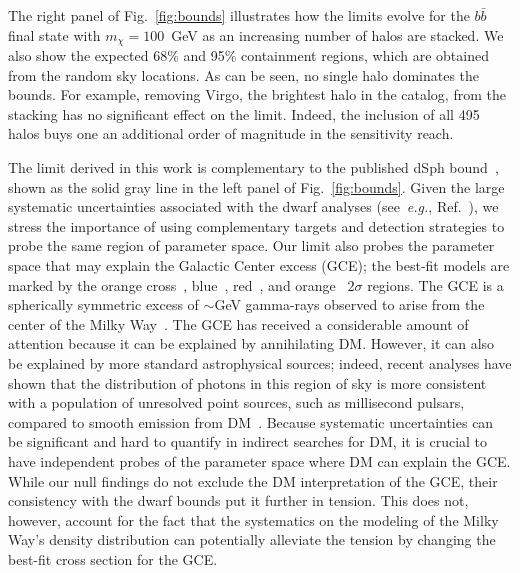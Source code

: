 The right panel of Fig.~\ref{fig:bounds} illustrates how the limits evolve for the $b \bar b$ final state with $m_\chi = 100$~GeV as an increasing number of halos are stacked.  We also show the expected 68\% and 95\% containment regions, which are obtained from the random sky locations.  As can be seen, no single halo dominates the bounds.  For example, removing Virgo, the brightest halo in the catalog, from the stacking has no significant effect on the limit.  Indeed, the inclusion of all 495 halos buys one an additional order of magnitude in the sensitivity reach.

The limit derived in this work is complementary to the published dSph bound~\cite{Ackermann:2015zua,Fermi-LAT:2016uux}, shown as the solid gray line in the left panel of Fig.~\ref{fig:bounds}. Given the large systematic uncertainties associated with the dwarf analyses (see~\emph{e.g.}, Ref.~\cite{Geringer-Sameth:2014qqa}), we stress the importance of using complementary targets and detection strategies to probe the same region of parameter space. Our limit also probes the parameter space that may explain the Galactic Center excess (GCE); the best-fit models are marked by the orange cross~\cite{Abazajian:2014fta}, blue~\cite{Calore:2014xka}, red~\cite{Gordon:2013vta}, and orange~\cite{Daylan:2014rsa} $2$$\sigma$ regions.  The GCE is a spherically symmetric excess of $\sim$GeV gamma-rays observed to arise from the center of the Milky Way~\cite{Goodenough:2009gk,Hooper:2010mq,TheFermi-LAT:2015kwa,Karwin:2016tsw}.  The GCE has received a considerable amount of attention because it can be explained by annihilating DM.  However, it can also be explained by more standard astrophysical sources; indeed, recent analyses have shown that the distribution of photons in this region of sky is more consistent with a population of unresolved point sources, such as millisecond pulsars, compared to smooth emission from DM~\cite{Lee:2015fea, Bartels:2015aea,Linden:2016rcf, FermiLAT:2017yoi}.  Because systematic uncertainties can be significant and hard to quantify in indirect searches for DM, it is crucial to have independent probes of the parameter space where DM can explain the GCE.  While our null findings do not exclude the DM interpretation of the GCE, their consistency with the dwarf bounds put it further in tension.  This does not, however, account for the fact that the systematics on the modeling of the Milky Way's density distribution can potentially alleviate the tension by changing the best-fit cross section for the GCE.   

